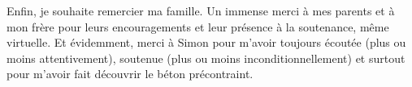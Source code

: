 Enfin, je souhaite remercier ma famille. Un immense merci à mes parents et à mon frère pour leurs
encouragements et leur présence à la soutenance, même virtuelle. Et évidemment, merci à Simon pour
m'avoir toujours écoutée (plus ou moins attentivement), soutenue (plus ou moins inconditionnellement)
et surtout pour m'avoir fait découvrir le béton précontraint.
